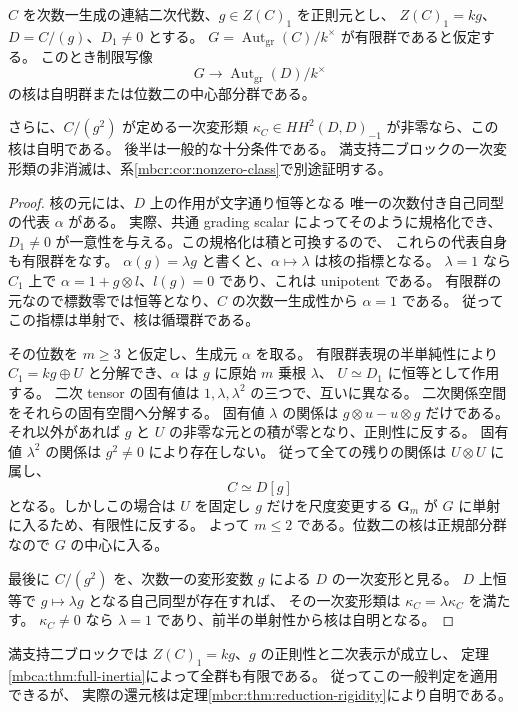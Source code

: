 \begin{proposition}[二次代数の中心還元の有限核]
\label{mbva:prop:central-reduction-kernel}
$C$ を次数一生成の連結二次代数、$g\in Z(C)_1$ を正則元とし、
$Z(C)_1=kg$、$D=C/(g)$、$D_1\ne0$ とする。
$G=\operatorname{Aut}_{\mathrm{gr}}(C)/k^\times$ が有限群であると仮定する。
このとき制限写像
\[
 G\longrightarrow\operatorname{Aut}_{\mathrm{gr}}(D)/k^\times
\]
の核は自明群または位数二の中心部分群である。

さらに、$C/(g^2)$ が定める一次変形類
$\kappa_C\in HH^2(D,D)_{-1}$ が非零なら、この核は自明である。
後半は一般的な十分条件である。
満支持二ブロックの一次変形類の非消滅は、系\ref{mbcr:cor:nonzero-class}で別途証明する。
\end{proposition}
\begin{proof}
核の元には、$D$ 上の作用が文字通り恒等となる
唯一の次数付き自己同型の代表 $\alpha$ がある。
実際、共通 grading scalar によってそのように規格化でき、
$D_1\ne0$ が一意性を与える。この規格化は積と可換するので、
これらの代表自身も有限群をなす。
$\alpha(g)=\lambda g$ と書くと、$\alpha\mapsto\lambda$ は核の指標となる。
$\lambda=1$ なら $C_1$ 上で
$\alpha=1+g\otimes l$、$l(g)=0$ であり、これは unipotent である。
有限群の元なので標数零では恒等となり、$C$ の次数一生成性から $\alpha=1$ である。
従ってこの指標は単射で、核は循環群である。

その位数を $m\ge3$ と仮定し、生成元 $\alpha$ を取る。
有限群表現の半単純性により
$C_1=kg\oplus U$ と分解でき、$\alpha$ は $g$ に原始 $m$ 乗根 $\lambda$、
$U\simeq D_1$ に恒等として作用する。
二次 tensor の固有値は $1,\lambda,\lambda^2$ の三つで、互いに異なる。
二次関係空間をそれらの固有空間へ分解する。
固有値 $\lambda$ の関係は $g\otimes u-u\otimes g$ だけである。
それ以外があれば $g$ と $U$ の非零な元との積が零となり、正則性に反する。
固有値 $\lambda^2$ の関係は $g^2\ne0$ により存在しない。
従って全ての残りの関係は $U\otimes U$ に属し、
\[
 C\simeq D[g]
\]
となる。しかしこの場合は $U$ を固定し $g$ だけを尺度変更する
$\mathbf G_m$ が $G$ に単射に入るため、有限性に反する。
よって $m\le2$ である。位数二の核は正規部分群なので $G$ の中心に入る。

最後に $C/(g^2)$ を、次数一の変形変数 $g$ による
$D$ の一次変形と見る。
$D$ 上恒等で $g\mapsto\lambda g$ となる自己同型が存在すれば、
その一次変形類は $\kappa_C=\lambda\kappa_C$ を満たす。
$\kappa_C\ne0$ なら $\lambda=1$ であり、前半の単射性から核は自明となる。
\end{proof}

満支持二ブロックでは $Z(C)_1=kg$、$g$ の正則性と二次表示が成立し、
定理\ref{mbca:thm:full-inertia}によって全群も有限である。
従ってこの一般判定を適用できるが、
実際の還元核は定理\ref{mbcr:thm:reduction-rigidity}により自明である。


